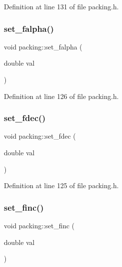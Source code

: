Definition at line 131 of file packing.\+h.

\mbox{\label{classpacking_af80acfd978be8d09fed22d40459bb3fc}} 
\subsubsection{\texorpdfstring{set\+\_\+falpha()}{set\_falpha()}}
{\footnotesize\ttfamily void packing\+::set\+\_\+falpha (\begin{DoxyParamCaption}\item[{double}]{val }\end{DoxyParamCaption})\hspace{0.3cm}{\ttfamily [inline]}}



Definition at line 126 of file packing.\+h.

\mbox{\label{classpacking_aaa7a1eb80bdf6f80a8d91415e4e03e69}} 
\subsubsection{\texorpdfstring{set\+\_\+fdec()}{set\_fdec()}}
{\footnotesize\ttfamily void packing\+::set\+\_\+fdec (\begin{DoxyParamCaption}\item[{double}]{val }\end{DoxyParamCaption})\hspace{0.3cm}{\ttfamily [inline]}}



Definition at line 125 of file packing.\+h.

\mbox{\label{classpacking_a8cb03b2d0af8408ba4c590ade7c738ca}} 
\subsubsection{\texorpdfstring{set\+\_\+finc()}{set\_finc()}}
{\footnotesize\ttfamily void packing\+::set\+\_\+finc (\begin{DoxyParamCaption}\item[{double}]{val }\end{DoxyParamCaption})\hspace{0.3cm}{\ttfamily [inline]}}



